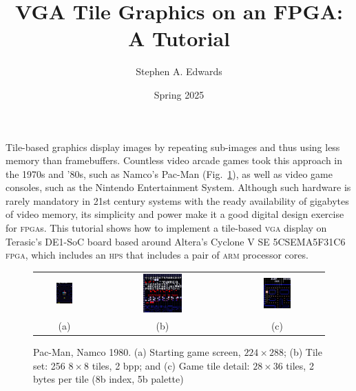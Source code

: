 \documentclass[11pt]{article}
\title{VGA Tile Graphics on an FPGA: A Tutorial}
\author{Stephen A. Edwards}
\date{Spring 2025}
\begin{document}
\maketitle

\noindent
Tile-based graphics display images by repeating sub-images and thus
using less memory than framebuffers.  Countless video arcade games
took this approach in the 1970s and '80s, such as Namco's Pac-Man
(Fig.~\ref{fig:pacman}), as well as video game consoles, such as the
Nintendo Entertainment System.  Although such hardware is rarely
mandatory in 21st century systems with the ready availability of
gigabytes of video memory, its simplicity and power make it a good
digital design exercise for \textsc{fpga}s.  This tutorial shows how
to implement a tile-based \textsc{vga} display on Terasic's DE1-SoC
board based around Altera's Cyclone V SE 5CSEMA5F31C6 \textsc{fpga},
which includes an \textsc{hps} that includes a pair of \textsc{arm}
processor cores.

\begin{figure}[h]
  \begin{tabular}{@{}ccc@{}}
    \includegraphics[width=0.31\textwidth]{pac-man-game1.png} &
    \includegraphics[width=0.31\textwidth]{pac-man-tiles.png} &
    \includegraphics[width=0.31\textwidth]{pac-man-game-tiles1.png} \\
    (a) & (b) & (c)
  \end{tabular}
\caption{Pac-Man, Namco 1980. (a) Starting game screen,
  $224\times288$; (b) Tile set: 256 $8\times8$ tiles, 2 bpp; and (c) Game tile detail: $28\times36$ tiles, 2 bytes per tile (8b index, 5b palette)}
\label{fig:pacman}
\end{figure}
\end{document}
